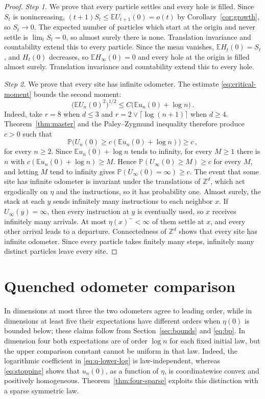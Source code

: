 \documentclass[11pt]{amsart}
\theoremstyle{plain}
\theoremstyle{definition}
\newcommand{\Z}{\mathbb{Z}}
\newcommand{\E}{\mathbb{E}}
\renewcommand{\P}{\mathbb{P}}
\begin{document}
\begin{proof}
	\smallskip
	\noindent\emph{Step 1.} We prove that every particle settles and every hole is
	filled.
	Since $S_t$ is nonincreasing, $(t+1)S_t\leq\E U_{t+1}(0)=o(t)$ by
	Corollary~\ref{cor:growth}, so $S_t\to0$. The expected
	number of particles which start at the origin and never settle is
	$\lim_tS_t=0$, so almost surely there is none. Translation invariance and
	countability extend this to every particle. Since the mean vanishes,
	$\E H_t(0)=S_t$, and $H_t(0)$ decreases, so $\E H_\infty(0)=0$ and every
	hole at the origin is filled almost surely. Translation invariance and
	countability extend this to every hole.

	\smallskip
	\noindent\emph{Step 2.} We prove that every site has infinite odometer.
	The estimate
	\eqref{eq:critical-moment} bounds the second moment:
	\[
		\bigl(\E U_n(0)^2\bigr)^{1/2}\leq C\bigl(\E u_n(0)+\log n\bigr)\,.
	\]
	Indeed, take $r=8$ when $d\leq3$ and $r=2\vee\lceil\log(n+1)\rceil$ when
	$d\geq4$. Theorem~\ref{thm:master} and the Paley--Zygmund inequality
	therefore produce $c>0$ such that
	\[
		\P\bigl(U_n(0)\geq c(\E u_n(0)+\log n)\bigr)\geq c\,,
	\]
	for every $n\geq2$. Since $\E u_n(0)+\log n$ tends to infinity, for every
	$M\geq1$ there is $n$ with $c(\E u_n(0)+\log n)\geq M$.
	Hence $\P(U_\infty(0)\geq M)\geq c$ for every $M$, and letting $M$
	tend to infinity gives $\P(U_\infty(0)=\infty)\geq c$.
	The event that some site has infinite odometer is invariant under the
	translations of $\Z^d$, which act ergodically on $\eta$ and the instructions,
	so it has probability one. Almost surely, the stack at each $y$ sends infinitely
	many instructions to each neighbor $x$. If $U_\infty(y)=\infty$, then every
	instruction at $y$ is eventually used, so $x$ receives infinitely many
	arrivals. At most $\eta(x)^-<\infty$ of them settle at $x$, and every other
	arrival leads to a departure. Connectedness of $\Z^d$ shows that every site
	has infinite odometer. Since every particle takes finitely many steps,
	infinitely many distinct particles leave every site.
\end{proof}

\section{Quenched odometer comparison}\label{sec:four}

In dimensions at most three the two odometers agree to leading order, while in
dimensions at least five their expectations have different orders when
$\eta(0)$ is bounded below; these claims follow from
Section~\ref{sec:bounds} and \eqref{eq:bp}. In dimension four both
expectations are of order $\log n$ for each fixed initial law, but the upper
comparison constant cannot be uniform in that law. Indeed, the logarithmic
coefficient in \eqref{eq:q-lower-log} is law-independent, whereas
\eqref{eq:stopping} shows that $u_n(0)$, as a function of $\eta$, is
coordinatewise convex and positively
homogeneous. Theorem~\ref{thm:four-sparse} exploits this distinction with a
sparse symmetric law.
\end{document}
